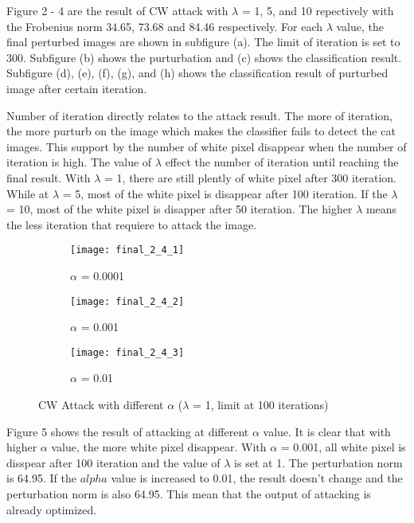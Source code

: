 \documentclass[11pt]{article}
\begin{document}
Figure 2 - 4 are the result of CW attack with $\lambda$ = 1, 5, and 10 repectively with the Frobenius norm 34.65, 73.68 and 84.46 respectively. For each $\lambda$ value, the final perturbed images are shown in subfigure (a). The limit of iteration is set to 300. Subfigure (b) shows the purturbation and (c) shows the classification result. Subfigure (d), (e), (f), (g), and (h) shows the classification result of purturbed image after certain iteration. 

Number of iteration directly relates to the attack result. The more of iteration, the more purturb on the image which makes the classifier fails to detect the cat images. This support by the number of white pixel disappear when the number of iteration is high. The value of $\lambda$ effect the number of iteration until reaching the final result. With $\lambda$ = 1, there are still plently of white pixel after 300 iteration. While at $\lambda$ = 5, most of the white pixel is disappear after 100 iteration. If the $\lambda$ = 10, most of the white pixel is disapper after 50 iteration. The higher $\lambda$ means the less iteration that requiere to attack the image.

\begin{figure}[H]
\begin{subfigure}{.3\textwidth}
  \centering
  \texttt{[image: final\_2\_4\_1]}
  \caption{$\alpha$ = 0.0001}
  \label{fig:}
\end{subfigure}
\begin{subfigure}{.3\textwidth}
  \centering
  \texttt{[image: final\_2\_4\_2]}
  \caption{$\alpha$ = 0.001}
  \label{fig:}
\end{subfigure}
\begin{subfigure}{.3\textwidth}
  \centering
  \texttt{[image: final\_2\_4\_3]}
  \caption{$\alpha$ = 0.01}
  \label{fig:}
\end{subfigure}

\caption{CW Attack with different $\alpha$ ($\lambda$ = 1, limit at 100 iterations)}
\label{fig:}
\end{figure}

Figure 5 shows the result of attacking at different $\alpha$ value. It is clear that with higher $\alpha$ value, the more white pixel disappear. With $\alpha$ = 0.001, all white pixel is disspear after 100 iteration and the value of $\lambda$ is set at 1. The perturbation norm is 64.95. If the $alpha$ value is increased to 0.01, the result doesn't change and the perturbation norm is also 64.95. This mean that the output of attacking is already optimized.
\end{document}
